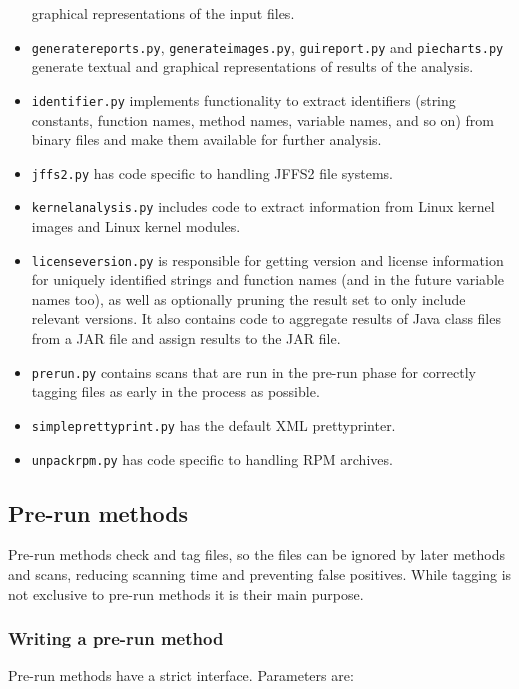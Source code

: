 \documentclass[10pt]{article}
\begin{document}
\begin{itemize}
graphical representations of the input files.
\item \texttt{generatereports.py}, \texttt{generateimages.py},
\texttt{guireport.py} and \texttt{piecharts.py} generate textual and graphical
representations of results of the analysis.
\item \texttt{identifier.py} implements functionality to extract identifiers
(string constants, function names, method names, variable names, and so on)
from binary files and make them available for further analysis.
\item \texttt{jffs2.py} has code specific to handling JFFS2 file systems.
\item \texttt{kernelanalysis.py} includes code to extract information from
Linux kernel images and Linux kernel modules.
\item \texttt{licenseversion.py} is responsible for getting version and
license information for uniquely identified strings and function names (and in
the future variable names too), as well as optionally pruning the result set
to only include relevant versions. It also contains code to aggregate results
of Java class files from a JAR file and assign results to the JAR file.
\item \texttt{prerun.py} contains scans that are run in the pre-run phase for
correctly tagging files as early in the process as possible.
\item \texttt{simpleprettyprint.py} has the default XML prettyprinter.
\item \texttt{unpackrpm.py} has code specific to handling RPM archives.
\end{itemize}

\subsection{Pre-run methods}

Pre-run methods check and tag files, so the files can be ignored by later
methods and scans, reducing scanning time and preventing false positives. While
tagging is not exclusive to pre-run methods it is their main purpose.

\subsubsection{Writing a pre-run method}

Pre-run methods have a strict interface. Parameters are:
\end{document}
